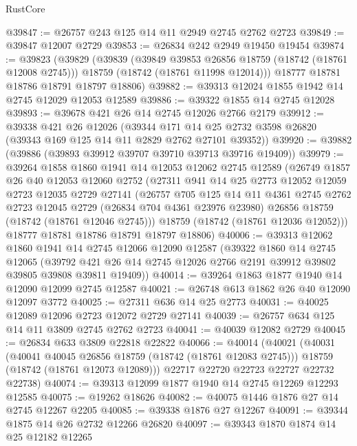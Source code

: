 \begin{lexlean}{RustCore}
\begin{coremodule}
@39847 := @26757 @243 @125 @14 @11 @2949 @2745 @2762 @2723
@39849 := @39847 @12007 @2729
@39853 := @26834 @242 @2949 @19450 @19454
@39874 := @39823
    (@39829
      (@39839
        (@39849 @39853 @26856 @18759 (@18742 (@18761 @12008 @2745)))
        @18759
        (@18742 (@18761 @11998 @12014)))
      @18777
      @18781
      @18786
      @18791
      @18797
      @18806)
@39882 := @39313 @12024 @1855 @1942 @14 @2745 @12029 @12053 @12589
@39886 := @39322 @1855 @14 @2745 @12028
@39893 := @39678 @421 @26 @14 @2745 @12026 @2766 @2179
@39912 := @39338
    @421
    @26
    @12026
    (@39344 @171 @14 @25 @2732 @3598 @26820 (@39343 @169 @125 @14 @11 @2829 @2762 @27101 @39352))
@39920 := @39882 (@39886 (@39893 @39912 @39707 @39710 @39713 @39716 @19409))
@39979 := @39264
    @1858
    @1860
    @1941
    @14
    @12053
    @12062
    @2745
    @12589
    (@26749
      @1857
      @26
      @40
      @12053
      @12060
      @2752
      (@27311
        @941
        @14
        @25
        @2773
        @12052
        @12059
        @2723
        @12035
        @2729
        @27141
        (@26757
          @705
          @125
          @14
          @11
          @4361
          @2745
          @2762
          @2723
          @12045
          @2729
          (@26834 @704 @4361 @23976 @23980)
          @26856
          @18759
          (@18742 (@18761 @12046 @2745)))
        @18759
        (@18742 (@18761 @12036 @12052)))
      @18777
      @18781
      @18786
      @18791
      @18797
      @18806)
@40006 := @39313
    @12062
    @1860
    @1941
    @14
    @2745
    @12066
    @12090
    @12587
    (@39322
      @1860
      @14
      @2745
      @12065
      (@39792 @421 @26 @14 @2745 @12026 @2766 @2191 @39912 @39802 @39805 @39808 @39811 @19409))
@40014 := @39264 @1863 @1877 @1940 @14 @12090 @12099 @2745 @12587
@40021 := @26748 @613 @1862 @26 @40 @12090 @12097 @3772
@40025 := @27311 @636 @14 @25 @2773
@40031 := @40025 @12089 @12096 @2723 @12072 @2729 @27141
@40039 := @26757 @634 @125 @14 @11 @3809 @2745 @2762 @2723
@40041 := @40039 @12082 @2729
@40045 := @26834 @633 @3809 @22818 @22822
@40066 := @40014
    (@40021
      (@40031
        (@40041 @40045 @26856 @18759 (@18742 (@18761 @12083 @2745)))
        @18759
        (@18742 (@18761 @12073 @12089)))
      @22717
      @22720
      @22723
      @22727
      @22732
      @22738)
@40074 := @39313 @12099 @1877 @1940 @14 @2745 @12269 @12293 @12585
@40075 := @19262 @18626
@40082 := @40075 @1446 @1876 @27 @14 @2745 @12267 @2205
@40085 := @39338 @1876 @27 @12267
@40091 := @39344 @1875 @14 @26 @2732 @12266 @26820
@40097 := @39343 @1870 @1874 @14 @25 @12182 @12265

\end{coremodule}
\end{lexlean}
